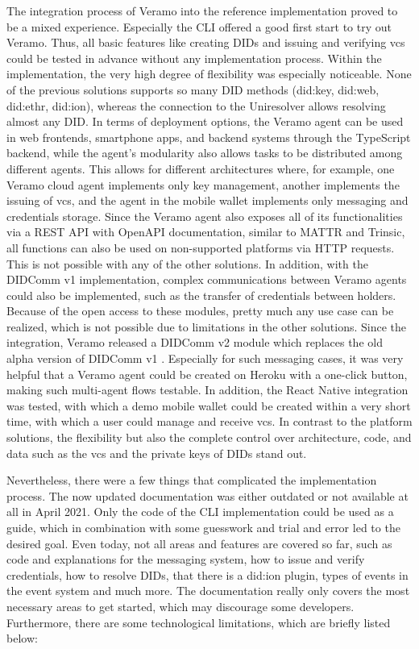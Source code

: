         The integration process of Veramo into the reference implementation proved to be a mixed experience. Especially the CLI offered a good first start to try out Veramo. Thus, all basic features like creating \acp{DID} and issuing and verifying \acp{vc} could be tested in advance without any implementation process. Within the implementation, the very high degree of flexibility was especially noticeable. None of the previous solutions supports so many DID methods (did:key, did:web, did:ethr, did:ion), whereas the connection to the Uniresolver allows resolving almost any DID. In terms of deployment options, the Veramo agent can be used in web frontends, smartphone apps, and backend systems through the TypeScript backend, while the agent's modularity also allows tasks to be distributed among different agents. This allows for different architectures where, for example, one Veramo cloud agent implements only key management, another implements the issuing of \acp{vc}, and the agent in the mobile wallet implements only messaging and credentials storage. Since the Veramo agent also exposes all of its functionalities via a REST API with OpenAPI documentation, similar to MATTR and Trinsic, all functions can also be used on non-supported platforms via HTTP requests. This is not possible with any of the other solutions. In addition, with the DIDComm v1 implementation, complex communications between Veramo agents could also be implemented, such as the transfer of credentials between holders. Because of the open access to these modules, pretty much any use case can be realized, which is not possible due to limitations in the other solutions. Since the integration, Veramo released a DIDComm v2 module which replaces the old alpha version of DIDComm v1 \cite{veramo_blog_2021}.
        Especially for such messaging cases, it was very helpful that a Veramo agent could be created on Heroku with a one-click button, making such multi-agent flows testable. In addition, the React Native integration was tested, with which a demo mobile wallet could be created within a very short time, with which a user could manage and receive \acp{vc}. 
        In contrast to the platform solutions, the flexibility but also the complete control over architecture, code, and data such as the \acp{vc} and the private keys of \acp{DID} stand out. 
    
        Nevertheless, there were a few things that complicated the implementation process. The now updated documentation was either outdated or not available at all in April 2021. Only the code of the CLI implementation could be used as a guide, which in combination with some guesswork and trial and error led to the desired goal. Even today, not all areas and features are covered so far, such as code and explanations for the messaging system, how to issue and verify credentials, how to resolve \acp{DID}, that there is a did:ion plugin, types of events in the event system and much more. The documentation really only covers the most necessary areas to get started, which may discourage some developers. Furthermore, there are some technological limitations, which are briefly listed below:
    

